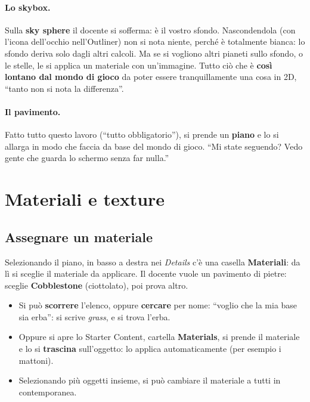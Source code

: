 \paragraph{Lo skybox.} Sulla \textbf{sky sphere} il docente si sofferma: è il
vostro sfondo. Nascondendola (con l'icona dell'occhio nell'Outliner) non si nota
niente, perché è totalmente bianca: lo sfondo deriva solo dagli altri calcoli. Ma
se si vogliono altri pianeti sullo sfondo, o le stelle, le si applica un
materiale con un'immagine. Tutto ciò che è \textbf{così lontano dal mondo di
gioco} da poter essere tranquillamente una cosa in 2D, ``tanto non si nota la
differenza''.

\paragraph{Il pavimento.} Fatto tutto questo lavoro (``tutto obbligatorio''), si
prende un \textbf{piano} e lo si allarga in modo che faccia da base del mondo di
gioco. ``Mi state seguendo? Vedo gente che guarda lo schermo senza far nulla.''

\section{Materiali e texture}
\label{gd11:sec:materiali}

\subsection{Assegnare un materiale}

Selezionando il piano, in basso a destra nei \emph{Details} c'è una casella
\textbf{Materiali}: da lì si sceglie il materiale da applicare. Il docente vuole
un pavimento di pietre: sceglie \textbf{Cobblestone} (ciottolato), poi prova
altro.
\begin{itemize}
  \item Si può \textbf{scorrere} l'elenco, oppure \textbf{cercare} per nome:
        ``voglio che la mia base sia erba'': si scrive \emph{grass}, e si trova
        l'erba.
  \item Oppure si apre lo Starter Content, cartella \textbf{Materials}, si
        prende il materiale e lo si \textbf{trascina} sull'oggetto: lo applica
        automaticamente (per esempio i mattoni).
  \item Selezionando più oggetti insieme, si può cambiare il materiale a
        tutti in contemporanea.
\end{itemize}

